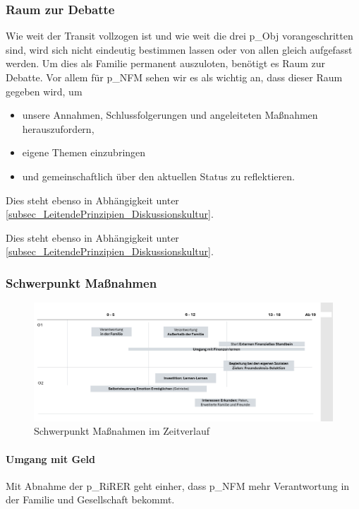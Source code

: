 \subsubsection{Raum zur Debatte} 
Wie weit der Transit vollzogen ist und wie weit die drei \gls{p_Obj} vorangeschritten sind, wird sich nicht eindeutig bestimmen lassen oder von allen gleich aufgefasst werden. Um dies als Familie permanent auszuloten, benötigt es Raum zur Debatte. Vor allem für \gls{p_NFM} sehen wir es als wichtig an, dass dieser Raum gegeben wird, um
\begin{itemize}
	\item unsere Annahmen, Schlussfolgerungen und angeleiteten Maßnahmen herauszufordern, 
	\item eigene Themen einzubringen
	\item und gemeinschaftlich über den aktuellen Status zu reflektieren.
\end{itemize}

Dies steht ebenso in Abhängigkeit unter \ref{subsec_LeitendePrinzipien_Diskussionskultur}.

Dies steht ebenso in Abhängigkeit unter \ref{subsec_LeitendePrinzipien_Diskussionskultur}.

\subsubsection{Schwerpunkt Maßnahmen}

\begin{figure}[H]
	\centering
	\includegraphics[scale = 0.3]{attachment/chapter_OWN/Scc008.png}
	\caption{Schwerpunkt Maßnahmen im Zeitverlauf}
\end{figure}

\paragraph{Umgang mit Geld}
Mit Abnahme der \gls{p_RiRER} geht einher, dass \gls{p_NFM} mehr Verantwortung in der Familie und Gesellschaft bekommt.\\


